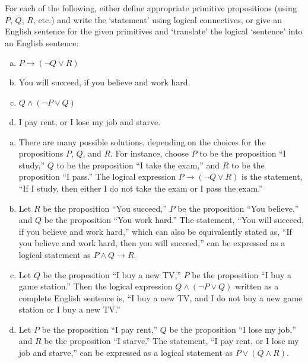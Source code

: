 \documentclass[11pt,letterpaper]{article}
\begin{document}
\newpage



 For each of the following, either define appropriate primitive propositions (using $P$, $Q$, $R$, etc.) and write the `statement' using logical connectives, or give an English sentence for the given primitives and `translate' the logical `sentence' into an English sentence:
	\begin{enumerate}[(a)]
	\item $P \to (\neg Q \vee R)$
	\item You will succeed, if you believe and work hard. 
	\item $Q \wedge (\neg P \vee Q)$
	\item I pay rent, or I lose my job and starve. 
	\end{enumerate} \pspace

\sol 
\begin{enumerate}[(a)]
\item There are many possible solutions, depending on the choices for the propositions $P$, $Q$, and $R$. For instance, choose $P$ to be the proposition ``I study,'' $Q$ to be the proposition ``I take the exam,'' and $R$ to be the proposition ``I pass.'' The logical expression $P \to (\neg Q \vee R)$ is the statement, ``If I study, then either I do not take the exam or I pass the exam.'' \pspace

\item Let $R$ be the proposition ``You succeed,'' $P$ be the proposition ``You believe,'' and $Q$ be the proposition ``You work hard.'' The statement, ``You will succeed, if you believe and work hard,'' which can also be equivalently stated as, ``If you believe and work hard, then you will succeed,'' can be expressed as a logical statement as $P \wedge Q \to R$. \pspace

\item Let $Q$ be the proposition ``I buy a new TV,'' $P$ be the proposition ``I buy a game station.'' Then the logical expression $Q \wedge (\neg P \vee Q)$ written as a complete English sentence is, ``I buy a new TV, and I do not buy a new game station or I buy a new TV.'' \pspace

\item Let $P$ be the proposition ``I pay rent,'' $Q$ be the proposition ``I lose my job,'' and $R$ be the proposition ``I starve.'' The statement, ``I pay rent, or I lose my job and starve,'' can be expressed as a logical statement as $P \vee (Q \wedge R)$. 
\end{enumerate}
\end{document}
